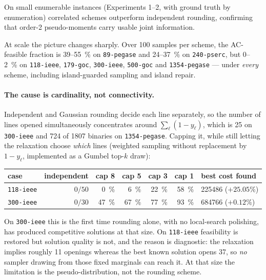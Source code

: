 \documentclass[11pt]{article}
\newcommand{\code}[1]{\texttt{\small #1}}
\begin{document}
On small enumerable instances (Experiments 1--2, with ground truth by enumeration) correlated schemes
outperform independent rounding, confirming that order-2 pseudo-moments carry usable joint information.

At scale the picture changes sharply. Over 100 samples per scheme, the AC-feasible fraction is
39--\SI{55}{\percent} on \code{89-pegase} and 24--\SI{37}{\percent} on \code{240-pserc}, but
0--\SI{2}{\percent} on \code{118-ieee}, \code{179-goc}, \code{300-ieee}, \code{500-goc} and
\code{1354-pegase} --- under \emph{every} scheme, including island-guarded sampling and island repair.

\paragraph{The cause is cardinality, not connectivity.} Independent and Gaussian rounding decide each
line separately, so the number of lines opened simultaneously concentrates around $\sum_\ell (1 - y_\ell)$,
which is 25 on \code{300-ieee} and \num{724} of \num{1807} binaries on \code{1354-pegase}. Capping it,
while still letting the relaxation choose \emph{which} lines (weighted sampling without replacement by
$1-y_\ell$, implemented as a Gumbel top-$k$ draw):

\begin{table}[h]\centering
\begin{tabular}{lrrrrrl}
\toprule
case & independent & cap 8 & cap 5 & cap 3 & cap 1 & best cost found \\
\midrule
\code{118-ieee} & $0/50$ & \SI{0}{\percent}  & \SI{6}{\percent}  & \SI{22}{\percent} & \SI{58}{\percent} & \num{225486} ($+25.05\%$) \\
\code{300-ieee} & $0/30$ & \SI{47}{\percent} & \SI{67}{\percent} & \SI{77}{\percent} & \SI{93}{\percent} & \num{684766} ($+0.12\%$) \\
\bottomrule
\end{tabular}
\end{table}

On \code{300-ieee} this is the first time rounding alone, with no local-search polishing, has produced
competitive solutions at that size. On \code{118-ieee} feasibility is restored but solution quality is
not, and the reason is diagnostic: the relaxation implies roughly 11 openings whereas the best known
solution opens \num{37}, so \emph{no} sampler drawing from those fixed marginals can reach it. At that
size the limitation is the pseudo-distribution, not the rounding scheme.
\end{document}
